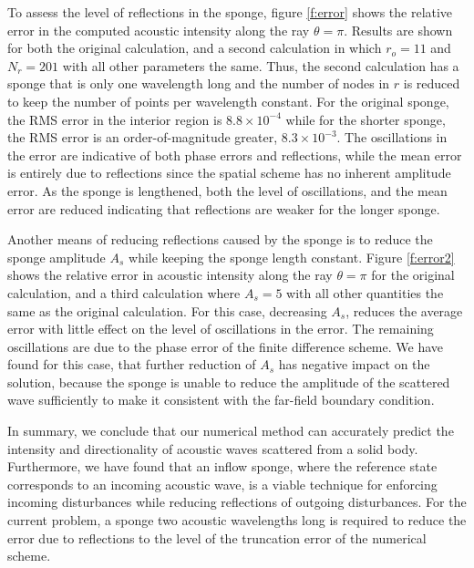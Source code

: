 To assess the level of reflections in the sponge, figure \ref{f:error} shows
the relative error in the computed acoustic intensity along the ray
$\theta=\pi$.  Results are shown for both the original calculation, and a
second calculation in which $r_o=11$ and $N_r = 201$ with all other parameters
the same.  Thus, the second calculation has a sponge that is only one
wavelength long and the number of nodes in $r$ is reduced to keep the number
of points per wavelength constant.  For the original sponge, the RMS error in
the interior region is $8.8 \times 10^{-4}$ while for the shorter sponge, the
RMS error is an order-of-magnitude greater, $8.3 \times 10^{-3}$.  The
oscillations in the error are indicative of both phase errors and reflections,
while the mean error is entirely due to reflections since the spatial scheme
has no inherent amplitude error.  As the sponge is lengthened, both the level
of oscillations, and the mean error are reduced indicating that reflections
are weaker for the longer sponge.

Another means of reducing reflections caused by the sponge is to reduce the
sponge amplitude $A_s$ while keeping the sponge length constant.  Figure
\ref{f:error2} shows the relative error in acoustic intensity along the ray
$\theta=\pi$ for the original calculation, and a third calculation where
$A_s=5$ with all other quantities the same as the original calculation.  For
this case, decreasing $A_s$, reduces the average error with little effect on
the level of oscillations in the error.  The remaining oscillations are due to
the phase error of the finite difference scheme.  We have found for this case,
that further reduction of $A_s$ has negative impact on the solution, because
the sponge is unable to reduce the amplitude of the scattered wave
sufficiently to make it consistent with the far-field boundary condition.

%
%
In summary, we conclude that our numerical method can accurately predict the
intensity and directionality of acoustic waves scattered from a solid body.
Furthermore, we have found that an inflow sponge, where the reference state
corresponds to an incoming acoustic wave, is a viable technique for enforcing
incoming disturbances while reducing reflections of outgoing disturbances.
For the current problem, a sponge two acoustic wavelengths long is required to
reduce the error due to reflections to the level of the truncation error of
the numerical scheme.

